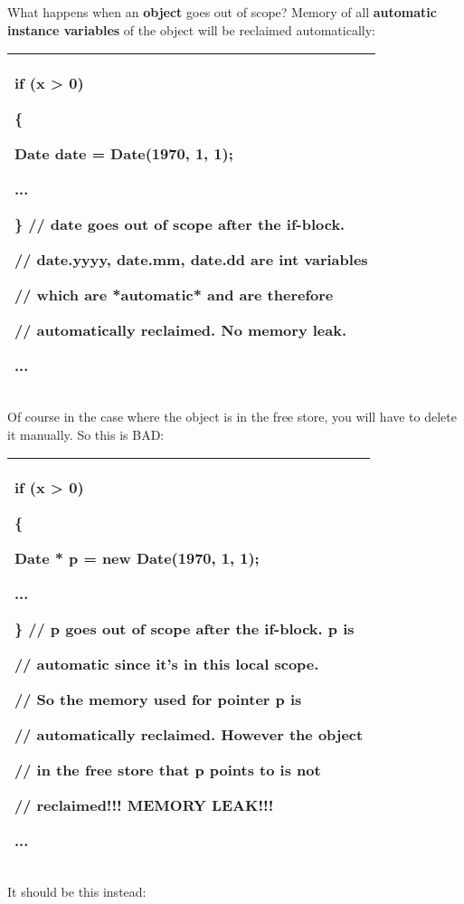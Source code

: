 \documentclass[
]{article}
\begin{document}
What happens when an \textbf{object} goes out of scope? Memory of all
\textbf{automatic instance variables} of the object will be reclaimed
automatically:

\begin{longtable}[]{@{}l@{}}
\toprule
\endhead
\begin{minipage}[t]{0.97\columnwidth}\raggedright
if (x \textgreater{} 0)

\{

Date date = Date(1970, 1, 1);

...

\} // date goes out of scope after the if-block.

// date.yyyy, date.mm, date.dd are int variables

// which are *automatic* and are therefore

// automatically reclaimed. No memory leak.

...\strut
\end{minipage}\tabularnewline
\bottomrule
\end{longtable}

Of course in the case where the object is in the free store, you will
have to delete it manually. So this is BAD:

\begin{longtable}[]{@{}l@{}}
\toprule
\endhead
\begin{minipage}[t]{0.97\columnwidth}\raggedright
if (x \textgreater{} 0)

\{

Date * p = new Date(1970, 1, 1);

...

\} // p goes out of scope after the if-block. p is

// automatic since it's in this local scope.

// So the memory used for pointer p is

// automatically reclaimed. However the object

// in the free store that p points to is not

// reclaimed!!! MEMORY LEAK!!!

...\strut
\end{minipage}\tabularnewline
\bottomrule
\end{longtable}

It should be this instead:
\end{document}
